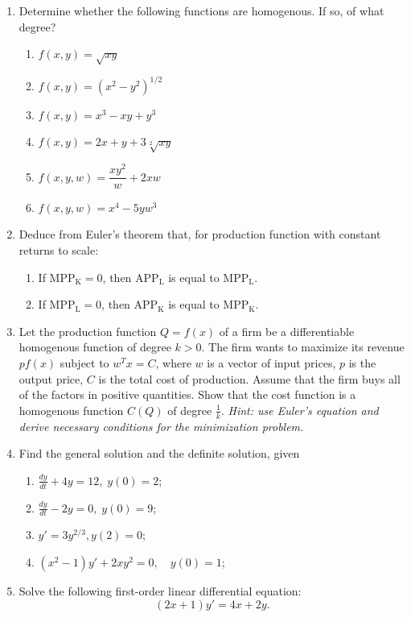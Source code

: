 \documentclass[12pt]{article} %
\theoremstyle{definition} %
\begin{document}
\begin{enumerate}
\item Determine whether the following functions are homogenous. If so, of what degree?

\begin{enumerate}
\item $f(x,y)=\sqrt{xy}$
\item $f(x, y)=(x^2-y^2)^{1/2}$
\item $f(x,y)=x^3-xy+y^3$
\item $f(x,y)= 2x+y+3 \sqrt[2]{xy}$
\item $f(x,y,w)=\dfrac{xy^2}w+2xw$
\item $f(x,y,w)=x^4-5yw^3$
\end{enumerate}

\item Deduce from Euler's theorem that, for production function with constant returns to scale:
\begin{enumerate}
\item If $\mathrm{MPP_K}= 0$, then $\mathrm{APP_L}$ is equal to $\mathrm{MPP_L}$.
\item If $\mathrm{MPP_L} = 0$, then $\mathrm{APP_K}$ is equal to $\mathrm{MPP_K}$.
\end{enumerate}

\item  Let the production function $Q=f(x)$ of a firm be a differentiable homogenous function of degree $k>0$. 
The firm wants to maximize its revenue $pf(x)$ subject to $w^Tx=C$, 
where $w$ is a vector of input prices, $p$  is the output price, $C$ is the total cost of production. 
Assume that the firm buys all of the factors in positive quantities. 
Show that the cost function is a homogenous function $C(Q)$ of degree $\frac 1k$. 
\textit{Hint: use Euler's equation and derive necessary conditions for the minimization problem.}
    
\item Find the general solution and the definite solution, given
\begin{enumerate}
\item $\frac{dy}{dt}+4y=12, \; y(0)=2$;
\item $\frac{dy}{dt}-2y=0, \; y(0)=9$;
\item $y'=3y^{2/3}, y(2)=0$;
\item $(x^2-1)y'+2xy^2=0,\quad y(0)=1$;
\end{enumerate}
\item Solve the following first-order linear differential equation:
\[
	(2x+1)y'=4x+2y.
\]
\end{enumerate}
\end{document}

